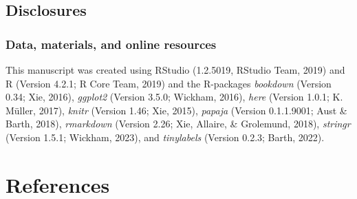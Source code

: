 \documentclass[
  ,man,mask,floatsintext]{apa6}
\begin{document}
\hypertarget{disclosures}{%
\subsection{Disclosures}\label{disclosures}}

\hypertarget{data-materials-and-online-resources}{%
\subsubsection{Data, materials, and online resources}\label{data-materials-and-online-resources}}

This manuscript was created using RStudio (1.2.5019, RStudio Team, 2019) and R (Version 4.2.1; R Core Team, 2019) and the R-packages \emph{bookdown} (Version 0.34; Xie, 2016), \emph{ggplot2} (Version 3.5.0; Wickham, 2016), \emph{here} (Version 1.0.1; K. Müller, 2017), \emph{knitr} (Version 1.46; Xie, 2015), \emph{papaja} (Version 0.1.1.9001; Aust \& Barth, 2018), \emph{rmarkdown} (Version 2.26; Xie, Allaire, \& Grolemund, 2018), \emph{stringr} (Version 1.5.1; Wickham, 2023), and \emph{tinylabels} (Version 0.2.3; Barth, 2022).

\hypertarget{references}{%
\section{References}\label{references}}

\setlength{\parindent}{-0.2in}
\setlength{\leftskip}{0.2in}
\end{document}
